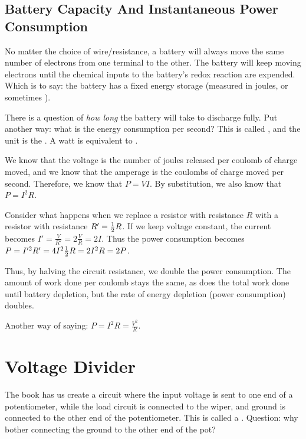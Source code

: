 \documentclass[11pt, oneside]{amsart}
\begin{document}
\subsection{Battery Capacity And Instantaneous Power Consumption}

No matter the choice of wire/resistance, a battery will always move the
same number of electrons from one terminal to the other. The battery
will keep moving electrons until the chemical inputs to the battery's
redox reaction are expended. Which is to say: the battery has a fixed
energy storage (measured in joules, or sometimes ).

There is a question of \emph{how long} the battery will take to
discharge fully. Put another way: what is the energy consumption per
second? This is called , and the unit is the
. A watt is equivalent to .

We know that the voltage is the number of joules released per coulomb of
charge moved, and we know that the amperage is the coulombs of charge
moved per second. Therefore, we know that $P=VI$. By substitution, we
also know that $P=I^2 R$.

Consider what happens when we replace a resistor with resistance $R$
with a resistor with resistance $R' = \frac{1}{2} R$. If we keep voltage
constant, the current becomes $I' = \frac{V}{R'} = 2 \frac{V}{R} = 2I$.
Thus the power consumption becomes $P = I'^2 R' = 4 I^2 \frac{1}{2} R = 2 I^2
R = 2P$.

Thus, by halving the circuit resistance, we double the power
consumption. The amount of work done per coulomb stays the same, as does
the total work done until battery depletion, but the rate of energy
depletion (power consumption) doubles.

Another way of saying: $P = I^2 R = \frac{V^2}{R}$.

\section{Voltage Divider}

\newcommand{\Rtot}{R_\text{total}}
\newcommand{\Rload}{R_\text{load}}
\newcommand{\Rpot}{R_\text{pot}}

The book has us create a circuit where the input voltage is sent to one
end of a potentiometer, while the load circuit is connected to the
wiper, and ground is connected to the other end of the potentiometer.
This is called a . Question: why bother
connecting the ground to the other end of the pot?
\end{document}
